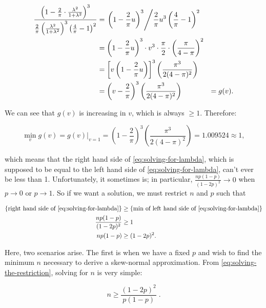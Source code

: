 \documentclass{article}
\begin{document}
\begin{alignat}{3}
  \frac{\left( 1 - \frac{2}{\pi} \cdot \frac{\lambda^2}{1+\lambda^2} \right)^3}{\frac{2}{\pi} \left( \frac{\lambda^2}{1+\lambda^2} \right)^3 \left( \frac{4}{\pi} - 1 \right)^2}
    &= \left. \left( 1 - \frac{2}{\pi} u \right)^3 \middle/ \frac{2}{\pi} u^3 \left( \frac{4}{\pi} - 1 \right)^2 \right. & \nonumber \\
  &= \left( 1 - \frac{2}{\pi} u \right)^3 \cdot v^3 \cdot \frac{\pi}{2} \cdot \left( \frac{\pi}{4-\pi} \right)^2 & \nonumber \\
  &= \left[ v \left( 1 - \frac{2}{\pi} u \right) \right]^3 \left( \frac{\pi^3}{2(4-\pi)^2} \right) & \nonumber \\
  &= \left( v - \frac{2}{\pi} \right)^3 \left( \frac{\pi^3}{2(4-\pi)^2} \right) &= g(v). \label{eq:lhs-solving-for-lambda}
\end{alignat}

We can see that $g(v)$ is increasing in $v$, which is always $\geq 1$.
Therefore:

\begin{equation}
  \min_{v} g(v) = g(v)|_{v=1} = \left( 1 - \frac{2}{\pi} \right)^3 \left( \frac{\pi^3}{2(4-\pi)^2} \right) = 1.009524 \approx 1,
\end{equation}

which means that the right hand side of \eqref{eq:solving-for-lambda}, which is
supposed to be equal to the left hand side of \eqref{eq:solving-for-lambda},
can't ever be less than 1. Unfortunately, it sometimes is; in particular,
$\frac{np(1-p)}{(1-2p)^2} \to 0$ when $p \to 0$ or $p \to 1$. So if we want a
solution, we must restrict $n$ and $p$ such that

\begin{align}
  \textnormal{\{right hand side of \eqref{eq:solving-for-lambda}\}} &\geq \textnormal{\{min of left hand side of \eqref{eq:solving-for-lambda}\}} \nonumber \\
  \frac{np(1-p)}{(1-2p)^2} &\geq 1 \nonumber \\
  np(1-p) &\geq (1-2p)^2. \label{eq:solving-the-restriction}
\end{align}

Here, two scenarios arise. The first is when we have a fixed $p$ and wish to
find the minimum $n$ necessary to derive a skew-normal approximation. From
\eqref{eq:solving-the-restriction}, solving for $n$ is very simple:

\begin{equation}
  n \geq \frac{(1-2p)^2}{p(1-p)} \;. \label{eq: n for a given p}
\end{equation}
\end{document}
